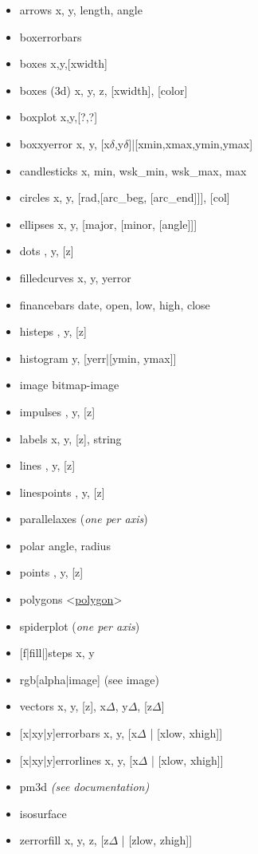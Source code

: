 {\footnotesize
\begin{itemize}
    \item arrows \quad x, y, length, angle
    \item boxerrorbars \quad 
    \item boxes \quad x,y,[xwidth]
    \item boxes (3d) \quad x, y, z, [xwidth], [color]
    \item boxplot \quad x,y,[?,?]
    \item boxxyerror \quad x, y, [x$\delta$,y$\delta$]|[xmin,xmax,ymin,ymax]
    \item candlesticks \quad x, min, wsk\_min, wsk\_max, max
    \item circles \quad x, y, [rad,[arc\_beg, [arc\_end]]], [col]
    \item ellipses \quad x, y, [major, [minor, [angle]]]
    \item dots \quad [x], y, [z]
    \item filledcurves \quad x, y, yerror
    \item financebars \quad date, open, low, high, close
    \item histeps \quad [x], y, [z]
    \item histogram \quad y, [yerr|[ymin, ymax]] 
    \item image \quad bitmap-image 
    \item impulses \quad [x], y, [z] 
    \item labels \quad x, y, [z], string 
    \item lines \quad [x], y, [z]
    \item linespoints \quad [x], y, [z]
    \item parallelaxes \quad (\textit{one per axis}) 
    \item polar  \quad angle, radius 
    \item points \quad [x], y, [z]
    \item polygons \quad <\href{http://gnuplot.sourceforge.net/demo\_5.5/polygons.html}{polygon}>
    \item spiderplot \quad (\textit{one per axis}) 
    \item {[f|fill|]}steps \quad x, y
    \item rgb[alpha|image] \quad (see image)
    \item vectors \quad x, y, [z], x$\Delta$, y$\Delta$, [z$\Delta$] 
    \item {[x|xy|y]}errorbars \quad x, y, [x$\Delta$ | [xlow, xhigh]] 
    \item {[x|xy|y]}errorlines \quad x, y, [x$\Delta$ | [xlow, xhigh]] 
    \item pm3d \quad \textit{(see documentation)}
    \item isosurface 
    \item zerrorfill \quad x, y, z, [z$\Delta$ | [zlow, zhigh]] 
\end{itemize}}

